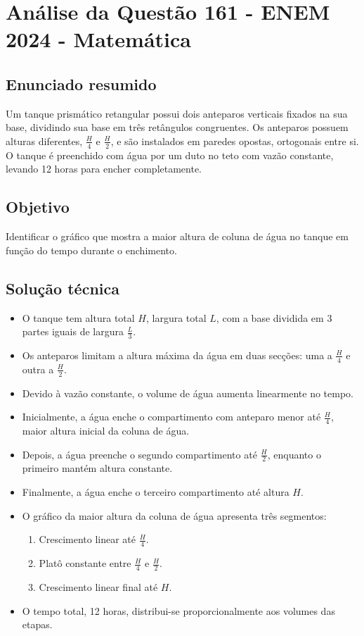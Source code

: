 \documentclass{article}
\begin{document}
\section*{Análise da Questão 161 - ENEM 2024 - Matemática}

\subsection*{Enunciado resumido}
Um tanque prismático retangular possui dois anteparos verticais fixados na sua base, dividindo sua base em três retângulos congruentes. Os anteparos possuem alturas diferentes, \(\frac{H}{4}\) e \(\frac{H}{2}\), e são instalados em paredes opostas, ortogonais entre si. O tanque é preenchido com água por um duto no teto com vazão constante, levando 12 horas para encher completamente.

\subsection*{Objetivo}
Identificar o gráfico que mostra a maior altura de coluna de água no tanque em função do tempo durante o enchimento.

\subsection*{Solução técnica}
\begin{itemize}
  \item O tanque tem altura total \(H\), largura total \(L\), com a base dividida em 3 partes iguais de largura \(\frac{L}{3}\).
  \item Os anteparos limitam a altura máxima da água em duas secções: uma a \(\frac{H}{4}\) e outra a \(\frac{H}{2}\).
  \item Devido à vazão constante, o volume de água aumenta linearmente no tempo.
  \item Inicialmente, a água enche o compartimento com anteparo menor até \(\frac{H}{4}\), maior altura inicial da coluna de água.
  \item Depois, a água preenche o segundo compartimento até \(\frac{H}{2}\), enquanto o primeiro mantém altura constante.
  \item Finalmente, a água enche o terceiro compartimento até altura \(H\).
  \item O gráfico da maior altura da coluna de água apresenta três segmentos:
    \begin{enumerate}
      \item Crescimento linear até \(\frac{H}{4}\).
      \item Platô constante entre \(\frac{H}{4}\) e \(\frac{H}{2}\).
      \item Crescimento linear final até \(H\).
    \end{enumerate}
  \item O tempo total, 12 horas, distribui-se proporcionalmente aos volumes das etapas.
\end{itemize}
\end{document}
